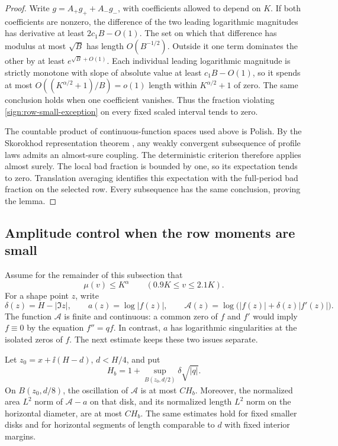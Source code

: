 \begin{proof}
Write \(g=A_+g_++A_-g_-\), with coefficients allowed to depend on
\(K\).  If both coefficients are nonzero, the difference of the two
leading logarithmic magnitudes has derivative at least \(2c_1B-O(1)\).
The set on which that difference has modulus at most \(\sqrt B\)
has length \(O(B^{-1/2})\).  Outside it one term dominates the other by
at least \(e^{\sqrt B+O(1)}\).  Each individual leading logarithmic
magnitude is strictly monotone with slope of absolute value at least
\(c_1B-O(1)\), so it spends at most
\(O((K^{\alpha/2}+1)/B)=o(1)\) length within
\(K^{\alpha/2}+1\) of zero.  The same conclusion holds when one
coefficient vanishes.  Thus the fraction violating
\eqref{sign:row-small-exception} on every fixed scaled interval tends
to zero.

The countable product of continuous-function spaces used above is
Polish. By the Skorokhod representation theorem
\cite[Chapter~10, Theorem~4, p.~239]{Pollard2002}, any weakly
convergent subsequence of profile laws admits an almost-sure coupling.
The deterministic criterion therefore applies almost surely.
The local bad fraction is bounded by one, so its expectation tends to
zero.  Translation averaging identifies this expectation with the
full-period bad fraction on the selected row.  Every subsequence has
the same conclusion, proving the lemma.
\end{proof}

\subsection{Amplitude control when the row moments are small}

Assume for the remainder of this subsection that
\begin{equation}\label{sign:low-moments}
 \mu(v)\le K^\alpha\qquad (0.9K\le v\le2.1K).
\end{equation}
For a shape point \(z\), write
\[
 \delta(z)=H-|\Im z|,\qquad
 a(z)=\log|f(z)|,\qquad
 \mathcal A(z)=\log\bigl(|f(z)|+\delta(z)|f'(z)|\bigr).
\]
The function \(\mathcal A\) is finite and continuous: a common zero of
\(f\) and \(f'\) would imply \(f\equiv0\) by the equation
\(f''=qf\).  In contrast, \(a\) has logarithmic singularities at the
isolated zeros of \(f\).  The next estimate keeps these two issues
separate.

\begin{lemma}
\label{sign:amplitude}
Let \(z_0=x+\ii(H-d)\), \(d<H/4\), and put
\[
 H_b=1+\sup_{B(z_0,d/2)}\delta\sqrt{|q|}.
\]
On \(B(z_0,d/8)\), the oscillation of \(\mathcal A\) is at most
\(CH_b\).  Moreover, the normalized area \(L^2\) norm of
\(\mathcal A-a\) on that disk, and its normalized length \(L^2\) norm
on the horizontal diameter, are at most \(CH_b\).  The same estimates
hold for fixed smaller disks and for horizontal segments of length
comparable to \(d\) with fixed interior margins.
\end{lemma}

